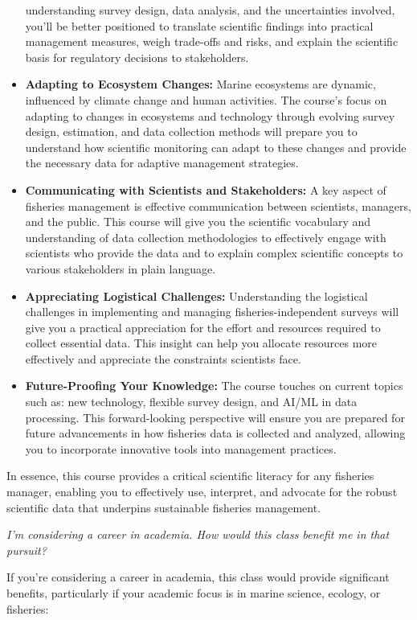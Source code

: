\documentclass[
  letterpaper,
  oneside,
  open=any]{scrbook}
\begin{document}
\begin{itemize}
  understanding survey design, data analysis, and the uncertainties
  involved, you'll be better positioned to translate scientific findings
  into practical management measures, weigh trade-offs and risks, and
  explain the scientific basis for regulatory decisions to stakeholders.
\item
  \textbf{Adapting to Ecosystem Changes:} Marine ecosystems are dynamic,
  influenced by climate change and human activities. The course's focus
  on adapting to changes in ecosystems and technology through evolving
  survey design, estimation, and data collection methods will prepare
  you to understand how scientific monitoring can adapt to these changes
  and provide the necessary data for adaptive management strategies.
\item
  \textbf{Communicating with Scientists and Stakeholders:} A key aspect
  of fisheries management is effective communication between scientists,
  managers, and the public. This course will give you the scientific
  vocabulary and understanding of data collection methodologies to
  effectively engage with scientists who provide the data and to explain
  complex scientific concepts to various stakeholders in plain language.
\item
  \textbf{Appreciating Logistical Challenges:} Understanding the
  logistical challenges in implementing and managing
  fisheries-independent surveys will give you a practical appreciation
  for the effort and resources required to collect essential data. This
  insight can help you allocate resources more effectively and
  appreciate the constraints scientists face.
\item
  \textbf{Future-Proofing Your Knowledge:} The course touches on current
  topics such as: new technology, flexible survey design, and AI/ML in
  data processing. This forward-looking perspective will ensure you are
  prepared for future advancements in how fisheries data is collected
  and analyzed, allowing you to incorporate innovative tools into
  management practices.
\end{itemize}

In essence, this course provides a critical scientific literacy for any
fisheries manager, enabling you to effectively use, interpret, and
advocate for the robust scientific data that underpins sustainable
fisheries management.

\emph{I'm considering a career in academia. How would this class benefit
me in that pursuit?}

If you're considering a career in academia, this class would provide
significant benefits, particularly if your academic focus is in marine
science, ecology, or fisheries:
\end{document}
